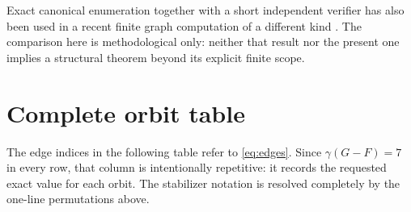 \documentclass[10pt]{article}
\begin{document}
Exact canonical enumeration together with a short independent verifier has
also been used in a recent finite graph computation of a different kind
\cite{Zeng2026Whiskered}.  The comparison here is methodological only: neither
that result nor the present one implies a structural theorem beyond its
explicit finite scope.

\section{Complete orbit table}

The edge indices in the following table refer to \eqref{eq:edges}.  Since
$\gamma(G-F)=7$ in every row, that column is intentionally repetitive: it
records the requested exact value for each orbit.  The stabilizer notation is
resolved completely by the one-line permutations above.
\end{document}
